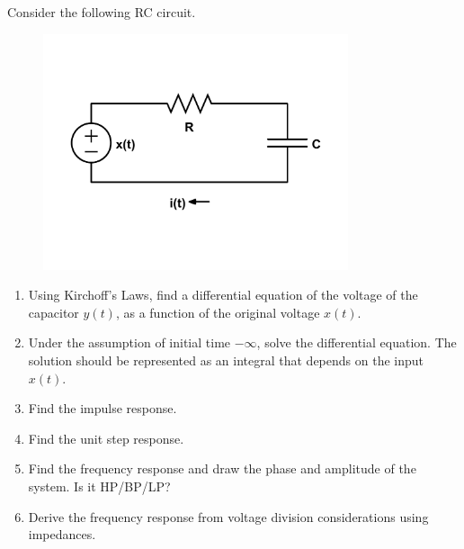 \documentclass[fleqn, a4paper, 11pt, oneside]{amsart}
\theoremstyle{definition}
\theoremstyle{theorem}
\begin{document}
\begin{question}
	Consider the following RC circuit.
	\begin{figure}[H]
		\centering
		\includegraphics[width = 0.8\textwidth]{./plot3.pdf}
	\end{figure}
	\begin{enumerate}
		\item
			Using Kirchoff's Laws, find a differential equation of the voltage of the capacitor $y(t)$, as a function of the original voltage $x(t)$.
		\item
			Under the assumption of initial time $-\infty$, solve the differential equation.
			The solution should be represented as an integral that depends on the input $x(t)$.
		\item
			Find the impulse response.
		\item
			Find the unit step response.
		\item
			Find the frequency response and draw the phase and amplitude of the system.
			Is it HP/BP/LP?
		\item
			Derive the frequency response from voltage division considerations using impedances.
	\end{enumerate}
\end{question}
\end{document}
